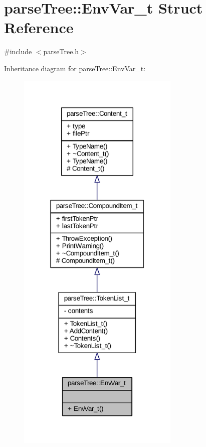 \hypertarget{structparse_tree_1_1_env_var__t}{}\section{parse\+Tree\+:\+:Env\+Var\+\_\+t Struct Reference}
\label{structparse_tree_1_1_env_var__t}


{\ttfamily \#include $<$parse\+Tree.\+h$>$}



Inheritance diagram for parse\+Tree\+:\+:Env\+Var\+\_\+t\+:
\nopagebreak
\begin{figure}[H]
\begin{center}
\leavevmode
\includegraphics[width=219pt]{structparse_tree_1_1_env_var__t__inherit__graph}
\end{center}
\end{figure}


